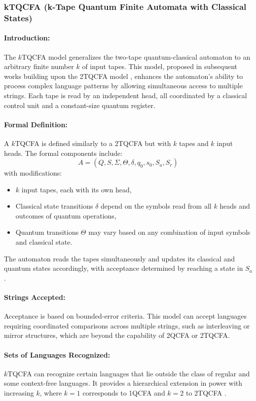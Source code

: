 \subsubsection{kTQCFA (k-Tape Quantum Finite Automata with Classical States)}

\paragraph{Introduction:}  
The $k$TQCFA model generalizes the two-tape quantum-classical automaton to an arbitrary finite number $k$ of input tapes. This model, proposed in subsequent works building upon the 2TQCFA model \cite{zheng2011two}, enhances the automaton’s ability to process complex language patterns by allowing simultaneous access to multiple strings. Each tape is read by an independent head, all coordinated by a classical control unit and a constant-size quantum register.

\paragraph{Formal Definition:}  
A $k$TQCFA is defined similarly to a 2TQCFA but with $k$ tapes and $k$ input heads. The formal components include:
\[
A = (Q, S, \Sigma, \Theta, \delta, q_0, s_0, S_a, S_r)
\]
with modifications:
\begin{itemize}
    \item $k$ input tapes, each with its own head,
    \item Classical state transitions $\delta$ depend on the symbols read from all $k$ heads and outcomes of quantum operations,
    \item Quantum transitions $\Theta$ may vary based on any combination of input symbols and classical state.
\end{itemize}
The automaton reads the tapes simultaneously and updates its classical and quantum states accordingly, with acceptance determined by reaching a state in $S_a$.

\paragraph{Strings Accepted:}  
Acceptance is based on bounded-error criteria. This model can accept languages requiring coordinated comparisons across multiple strings, such as interleaving or mirror structures, which are beyond the capability of 2QCFA or 2TQCFA.

\paragraph{Sets of Languages Recognized:}  
$k$TQCFA can recognize certain languages that lie outside the class of regular and some context-free languages. It provides a hierarchical extension in power with increasing $k$, where $k=1$ corresponds to 1QCFA and $k=2$ to 2TQCFA \cite{li2015hybrid}.

